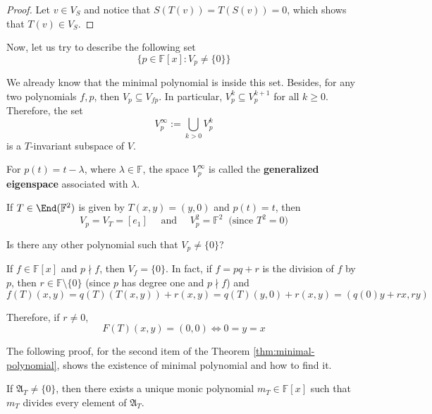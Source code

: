 \begin{proof}
	Let $v \in V_S$ and notice that $S(T(v)) = T(S(v)) = 0$, which shows that $T(v) \in V_S$.
\end{proof}

Now, let us try to describe the following set
\begin{equation}\label{eq:set-goal-describe}
	\{ p \in \mathbb{F}[x] : V_p \neq \{ 0 \} \}
\end{equation}

We already know that the minimal polynomial is inside this set. Besides, for any two polynomials $f, p$, then $V_p \subseteq V_{fp}$. In particular, $V_p^k \subseteq V_p^{k+1}$ for all $k \geq 0$. Therefore, the set
\[
	V_p^\infty := \bigcup_{k > 0} V_p^k
\]
is a $T$-invariant subspace of $V$.

\begin{definition}
	For $p(t) = t - \lambda$, where $\lambda \in \mathbb{F}$, the space $V_p^\infty$ is called the \textbf{generalized eigenspace} associated with $\lambda$.
\end{definition}

\begin{example}
	If $T \in \End(\mathbb{F}^2)$ is given by $T(x,y) = (y,0)$ and $p(t) = t$, then
	\[
		V_p = V_T = [e_1] \quad \text{ and } \quad V_p^2 = \mathbb{F}^2 ~\text{ (since $T^2 = 0$)}
	\]
	
	Is there any other polynomial such that $V_p \neq \{ 0 \}$?
	
	If $f \in \mathbb{F}[x]$ and $p \nmid f$, then $V_f = \{ 0 \}$. In fact, if $f = pq+r$ is the division of $f$ by $p$, then $r \in \mathbb{F} \setminus \{ 0 \}$ (since $p$ has degree one and $p \nmid f$) and
	\[
		f(T)(x,y) = q(T)(T(x,y)) + r(x,y) = q(T)(y,0) + r(x,y) = (q(0)y + rx, ry)
	\]
	
	Therefore, if $r \neq 0$, 
	\[
		F(T)(x,y) = (0, 0) \iff 0 = y = x
	\]
\end{example}

The following proof, for the second item of the Theorem \ref{thm:minimal-polynomial}, shows the existence of minimal polynomial and how to find it.

\begin{theorem}
	If $\mathfrak{A}_T \neq \{ 0 \}$, then there exists a unique monic polynomial $m_T \in \mathbb{F}[x]$ such that $m_T$ divides every element of $\mathfrak{A}_T$.
\end{theorem}

